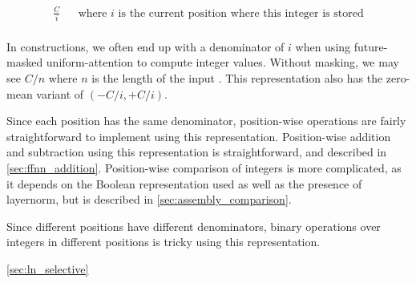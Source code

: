   \begin{align*}
    \frac{C}{i} & & \text{where $i$ is the current position where this integer is stored}\\
  \end{align*}

In constructions, we often end up with a denominator of $i$ when using future-masked uniform-attention to compute integer values.
Without masking, we may see $C/n$ where $n$ is the length of the input \cite{chiang+:icml2023}.
This representation also has the zero-mean variant of $(-C/i, +C/i)$.

Since each position has the same denominator, position-wise operations are fairly straightforward to implement using this representation. Position-wise addition and subtraction using this representation is straightforward, and described in \cref{sec:ffnn_addition}. Position-wise comparison of integers is more complicated, as it depends on the Boolean representation used as well as the presence of layernorm, but is described in \cref{sec:assembly_comparison}.

Since different positions have different denominators,  binary operations over integers in different positions is tricky using this representation.

\cref{sec:ln_selective}

